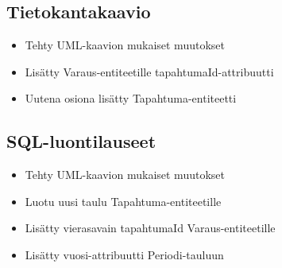 \documentclass[11pt,a4paper]{article}
\begin{document}
\subsection*{Tietokantakaavio}

\begin{itemize}
    \item Tehty UML-kaavion mukaiset muutokset
    \item Lisätty Varaus-entiteetille tapahtumaId-attribuutti
    \item Uutena osiona lisätty Tapahtuma-entiteetti
\end{itemize}

\subsection*{SQL-luontilauseet}

\begin{itemize}
    \item Tehty UML-kaavion mukaiset muutokset
    \item Luotu uusi taulu Tapahtuma-entiteetille
    \item Lisätty vierasavain tapahtumaId Varaus-entiteetille
    \item Lisätty vuosi-attribuutti Periodi-tauluun
\end{itemize}
\end{document}
